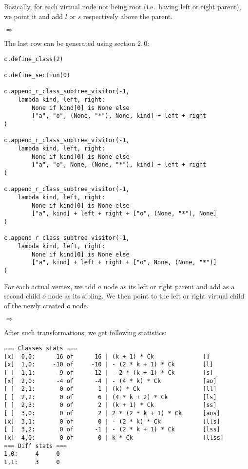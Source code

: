 \documentclass[final]{article}
\theoremstyle{definition}
\theoremstyle{definition}
\theoremstyle{remark}
\newcommand{\includeinlinesvg}[2]{\begin{minipage}{#1\textwidth}\end{minipage}}
\begin{document}
Basically, for each virtual node not being root (i.e.\ having left or right parent), we point it and add \(l\) or \(s\) respectively above the parent.

\includeinlinesvg{.32}{lambda__trees_111__1_base}%
\(\Rightarrow\)
\includeinlinesvg{.32}{lambda__trees_101__0}%
\includeinlinesvg{.32}{lambda__trees_112__0}%

The last row can be generated using section \(2, 0\):

\begin{lstlisting}
c.define_class(2)

c.define_section(0)

c.append_r_class_subtree_visitor(-1,
    lambda kind, left, right:
        None if kind[0] is None else
        ["a", "o", (None, "*"), None, kind] + left + right
)

c.append_r_class_subtree_visitor(-1,
    lambda kind, left, right:
        None if kind[0] is None else
        ["a", "o", None, (None, "*"), kind] + left + right
)

c.append_r_class_subtree_visitor(-1,
    lambda kind, left, right:
        None if kind[0] is None else
        ["a", kind] + left + right + ["o", (None, "*"), None]
)

c.append_r_class_subtree_visitor(-1,
    lambda kind, left, right:
        None if kind[0] is None else
        ["a", kind] + left + right + ["o", None, (None, "*")]
)
\end{lstlisting}

For each actual vertex, we add \(a\) node as its left or right parent and add as a second child \(o\) node as its sibling. We then point to the left or right virtual child of the newly created \(o\) node.

\includeinlinesvg{.20}{lambda__trees_200__0_base}%
\(\Rightarrow\)
\includeinlinesvg{.20}{lambda__trees_200__0}%
\includeinlinesvg{.20}{lambda__trees_201__0}%
\includeinlinesvg{.20}{lambda__trees_202__0}%
\includeinlinesvg{.20}{lambda__trees_203__0}%

After such transformations, we get following statistics:

\begin{lstlisting}
=== Classes stats ===
[x]  0,0:      16 of      16 | (k + 1) * Ck              []
[x]  1,0:     -10 of     -10 | - (2 * k + 1) * Ck        [l]
[ ]  1,1:      -9 of     -12 | - 2 * (k + 1) * Ck        [s]
[x]  2,0:      -4 of      -4 | - (4 * k) * Ck            [ao]
[ ]  2,1:       0 of       1 | (k) * Ck                  [ll]
[ ]  2,2:       0 of       6 | (4 * k + 2) * Ck          [ls]
[ ]  2,3:       0 of       2 | (k + 1) * Ck              [ss]
[ ]  3,0:       0 of       2 | 2 * (2 * k + 1) * Ck      [aos]
[x]  3,1:       0 of       0 | - (2 * k) * Ck            [lls]
[ ]  3,2:       0 of      -1 | - (2 * k + 1) * Ck        [lss]
[x]  4,0:       0 of       0 | k * Ck                    [llss]
=== Diff stats ===
1,0:     4     0
1,1:     3     0
\end{lstlisting}
\end{document}
